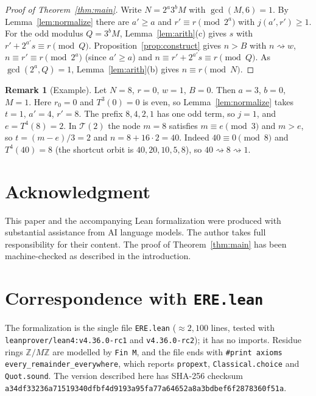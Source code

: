 \documentclass[11pt,reqno,oneside]{amsart}
\theoremstyle{plain}
\theoremstyle{definition}
\newtheorem{remark}[theorem]{Remark}
\numberwithin{equation}{section}
\newcommand{\Z}{\mathbb{Z}}
\newcommand{\ZM}{\Z/M\Z}
\newcommand{\Tr}{\mathcal{T}}
\newcommand{\reaches}{\rightsquigarrow}
\begin{document}
\begin{proof}[Proof of Theorem~\ref{thm:main}]
Write $N=2^a3^bM$ with $\gcd(M,6)=1$. By Lemma~\ref{lem:normalize} there are $a'\ge a$ and $r'\equiv r\pmod{2^a}$ with $j(a',r')\ge1$. For the odd modulus $Q=3^bM$, Lemma~\ref{lem:arith}(c) gives $s$ with $r'+2^{a'}s\equiv r\pmod Q$. Proposition~\ref{prop:construct} gives $n>B$ with $n\reaches w$, $n\equiv r'\equiv r\pmod{2^a}$ (since $a'\ge a$) and $n\equiv r'+2^{a'}s\equiv r\pmod Q$. As $\gcd(2^a,Q)=1$, Lemma~\ref{lem:arith}(b) gives $n\equiv r\pmod N$.
\end{proof}

\begin{remark}[Example]
Let $N=8$, $r=0$, $w=1$, $B=0$. Then $a=3$, $b=0$, $M=1$. Here $r_0=0$ and $T^3(0)=0$ is even, so Lemma~\ref{lem:normalize} takes $t=1$, $a'=4$, $r'=8$. The prefix $8,4,2,1$ has one odd term, so $j=1$, and $e=T^4(8)=2$. In $\Tr(2)$ the node $m=8$ satisfies $m\equiv e\pmod 3$ and $m>e$, so $t=(m-e)/3=2$ and $n=8+16\cdot2=40$. Indeed $40\equiv0\pmod8$ and $T^4(40)=8$ (the shortcut orbit is $40,20,10,5,8$), so $40\reaches8\reaches1$.
\end{remark}

\section*{Acknowledgment}
This paper and the accompanying Lean formalization were produced with substantial assistance from AI language models. The author takes full responsibility for their content. The proof of Theorem~\ref{thm:main} has been machine-checked as described in the introduction.

\newpage
\appendix
\section{Correspondence with \texttt{ERE.lean}}
The formalization is the single file \texttt{ERE.lean} ($\approx2{,}100$ lines, tested with \texttt{leanprover/\allowbreak lean4:\allowbreak v4.36.0-rc1} and \texttt{v4.36.0-rc2}); it has no imports. Residue rings $\ZM$ are modelled by \texttt{Fin M}, and the file ends with \texttt{\#print axioms every\_\allowbreak remainder\_\allowbreak everywhere}, which reports \texttt{propext}, \texttt{Classical.choice} and \texttt{Quot.sound}. The version described here has SHA-256 checksum \texttt{a34df33236a71519340dfbf4d9193a95\allowbreak fa77a64652a8a3bdbef6f2878360f51a}.
\end{document}
